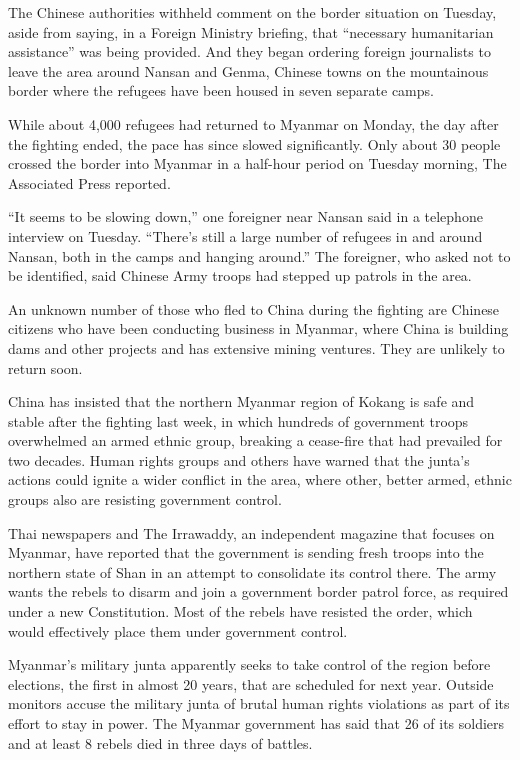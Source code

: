﻿\documentclass[12pt]{article}
\begin{document}
The Chinese authorities withheld comment on the border situation on Tuesday, aside from saying, in a
Foreign Ministry briefing, that ``necessary humanitarian assistance'' was being provided. And they
began ordering foreign journalists to leave the area around Nansan and Genma, Chinese towns on the
mountainous border where the refugees have been housed in seven separate camps.

While about 4,000 refugees had returned to Myanmar on Monday, the day after the fighting ended, the
pace has since slowed significantly. Only about 30 people crossed the border into Myanmar in a
half-hour period on Tuesday morning, The Associated Press reported.

``It seems to be slowing down,'' one foreigner near Nansan said in a telephone interview on Tuesday.
``There's still a large number of refugees in and around Nansan, both in the camps and hanging
around.'' The foreigner, who asked not to be identified, said Chinese Army troops had stepped up
patrols in the area.

An unknown number of those who fled to China during the fighting are Chinese citizens who have been
conducting business in Myanmar, where China is building dams and other projects and has extensive
mining ventures. They are unlikely to return soon.

China has insisted that the northern Myanmar region of Kokang is safe and stable after the fighting
last week, in which hundreds of government troops overwhelmed an armed ethnic group, breaking a
cease-fire that had prevailed for two decades. Human rights groups and others have warned that the
junta's actions could ignite a wider conflict in the area, where other, better armed, ethnic groups
also are resisting government control.

Thai newspapers and The Irrawaddy, an independent magazine that focuses on Myanmar, have reported
that the government is sending fresh troops into the northern state of Shan in an attempt to
consolidate its control there. The army wants the rebels to disarm and join a government border
patrol force, as required under a new Constitution. Most of the rebels have resisted the order,
which would effectively place them under government control.

Myanmar's military junta\cite{junta} apparently seeks to take control of the region before
elections, the first in almost 20 years, that are scheduled for next year. Outside monitors accuse
the military junta of brutal human rights violations as part of its effort to stay in power. The
Myanmar government has said that 26 of its soldiers and at least 8 rebels died in three days of
battles.
\end{document}
